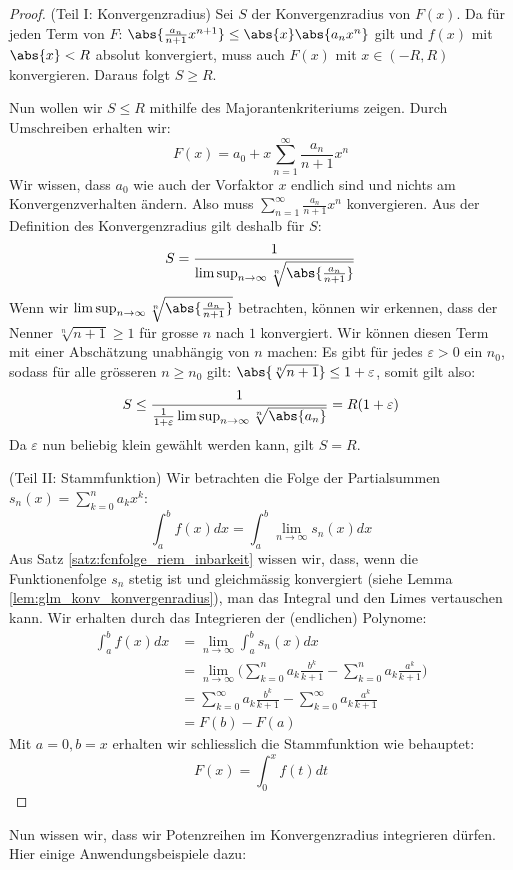 \begin{proof} (Teil I: Konvergenzradius) 
Sei $S$ der Konvergenzradius von $F(x)$. Da für jeden Term von $F$: $\abs{\frac{a_{n}}{n+1}x^{n+1}} \leq \abs{x}\abs{a_{n}x^n}$ gilt und $f(x)$ mit $\abs{x} < R$ absolut konvergiert, muss auch $F(x)$  mit $x \in (-R, R)$ konvergieren. Daraus folgt $S \geq R$.

Nun wollen wir $S \leq R$ mithilfe des Majorantenkriteriums zeigen. Durch Umschreiben erhalten wir:
$$F(x) = a_0 + x\sum_{n=1}^\infty\frac{a_n}{n+1} x^n$$
Wir wissen, dass $a_0$ wie auch der Vorfaktor $x$ endlich sind und nichts am Konvergenzverhalten ändern. Also muss $\sum_{n=1}^\infty\frac{a_n}{n+1} x^n$ konvergieren. Aus der Definition des Konvergenzradius gilt deshalb für $S$:
$$S = \frac{1}{\limsup_{n \to \infty}\sqrt[n]{\abs{\frac{a_n}{n+1}}}}$$
Wenn wir $\limsup_{n \to \infty}\sqrt[n]{\abs{\frac{a_n}{n+1}}}$ betrachten, können wir erkennen, dass der Nenner $\sqrt[n]{n+1} \geq 1$ für grosse $n$ nach $1$ konvergiert. Wir können diesen Term mit einer Abschätzung unabhängig von $n$ machen: Es gibt für jedes $\varepsilon > 0$ ein $n_0$, sodass für alle grösseren $n \geq n_0$ gilt: $\abs{\sqrt[n]{n+1}} \leq 1+\varepsilon$, somit gilt also:
$$S \leq \frac{1}{\frac{1}{1+\varepsilon}\limsup_{n \to \infty}\sqrt[n]{\abs{a_n}}} = R(1+\varepsilon)$$
Da $\varepsilon$ nun beliebig klein gewählt werden kann, gilt $S = R$.

(Teil II: Stammfunktion) Wir betrachten die Folge der Partialsummen $s_n(x) = \sum_{k=0}^na_kx^k$:
$$\int_a^bf(x) dx = \int_a^b \lim_{n \to \infty} s_n(x) dx$$
Aus Satz \ref{satz:fcnfolge_riem_inbarkeit} wissen wir, dass, wenn die Funktionenfolge $s_n$ stetig ist und gleichmässig konvergiert (siehe Lemma \ref{lem:glm_konv_konvergenradius}), man das Integral und den Limes vertauschen kann. Wir erhalten durch das Integrieren der (endlichen) Polynome:
\begin{align*}
    \int_a^bf(x) dx &= \lim_{n \to \infty} \int_a^b s_n(x) dx\\
        &= \lim_{n \to \infty}\Big( \sum_{k=0}^n a_k \frac{b^k}{k+1} -\sum_{k=0}^n a_k \frac{a^k}{k+1} \Big)\\
        &= \sum_{k=0}^\infty a_k \frac{b^k}{k+1} -\sum_{k=0}^\infty a_k \frac{a^k}{k+1}\\
        &= F(b) - F(a)
\end{align*}
Mit $a=0, b=x$ erhalten wir schliesslich die Stammfunktion wie behauptet:
$$F(x) = \int_0^xf(t) dt$$
\end{proof}
Nun wissen wir, dass wir Potenzreihen im Konvergenzradius integrieren dürfen. Hier einige Anwendungsbeispiele dazu:

